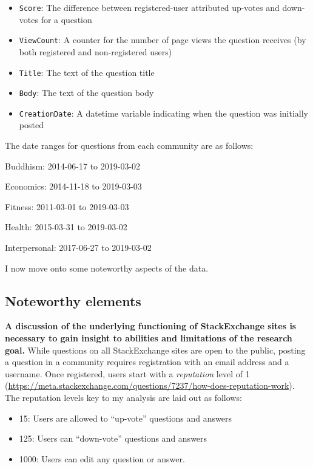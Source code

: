\documentclass[11pt,preprint, authoryear]{article}
\numberwithin{equation}{section}
\numberwithin{figure}{section}
\begin{document}

\begin{itemize}
\item
  \texttt{Score}: The difference between registered-user attributed
  up-votes and down-votes for a question
\item
  \texttt{ViewCount}: A counter for the number of page views the
  question receives (by both registered and non-registered users)
\item
  \texttt{Title}: The text of the question title
\item
  \texttt{Body}: The text of the question body
\item
  \texttt{CreationDate}: A datetime variable indicating when the
  question was initially posted
\end{itemize}


The date ranges for questions from each community are as follows:

Buddhism: 2014-06-17 to 2019-03-02

Economics: 2014-11-18 to 2019-03-03

Fitness: 2011-03-01 to 2019-03-03

Health: 2015-03-31 to 2019-03-02

Interpersonal: 2017-06-27 to 2019-03-02

I now move onto some noteworthy aspects of the data.

\subsection{\texorpdfstring{Noteworthy elements
\label{noteworthy}}{Noteworthy elements }}\label{noteworthy-elements}

\textbf{A discussion of the underlying functioning of StackExchange
sites is necessary to gain insight to abilities and limitations of the
research goal.} While questions on all StackExchange sites are open to
the public, posting a question in a community requires registration with
an email address and a username. Once registered, users start with a
\emph{reputation} level of 1
(\url{https://meta.stackexchange.com/questions/7237/how-does-reputation-work}).
The reputation levels key to my analysis are laid out as follows:


\begin{itemize}
\item
  15: Users are allowed to ``up-vote'' questions and answers
\item
  125: Users can ``down-vote'' questions and answers
\item
  1000: Users can edit any question or answer.
\end{itemize}
\end{document}
